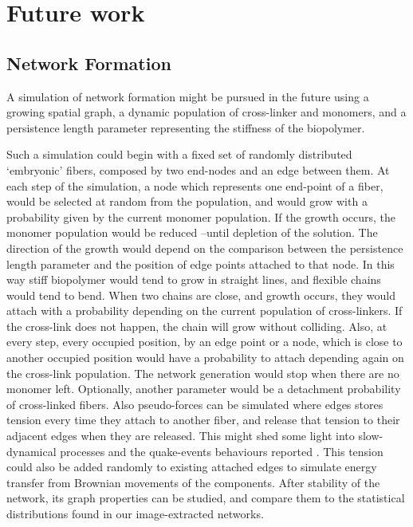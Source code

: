 \section{Future work}%
\label{sec:future_work}

\subsection{Network Formation}%
\label{sub:network_formation}

A simulation of network formation might be pursued in the future
  using a growing spatial graph, a dynamic population of cross-linker and monomers, and a persistence length parameter representing the stiffness of the biopolymer.

  Such a simulation could begin with a fixed set of randomly distributed `embryonic' fibers, composed by two end-nodes and an edge between them. At each step of the simulation, a node which represents one end-point of a fiber, would be selected at random from the population, and would grow with a probability given by the current monomer population. If the growth occurs, the monomer population would be reduced --until depletion of the solution. The direction of the growth would depend on the comparison between the persistence length parameter and the position of edge points attached to that node. In this way stiff biopolymer would tend to grow in straight lines, and flexible chains would tend to bend.
  When two chains are close, and growth occurs, they would attach with a probability depending on the current population of cross-linkers. If the cross-link does not happen, the chain will grow without colliding. Also, at every step, every occupied position, by an edge point or a node, which is close to another occupied position would have a probability to attach depending again on the cross-link population. The network generation would stop when there are no monomer left. Optionally, another parameter would be a detachment probability of cross-linked fibers. Also pseudo-forces can be simulated where edges stores tension every time they attach to another fiber, and release that tension to their adjacent edges when they are released. This might shed some light into slow-dynamical processes and the quake-events behaviours reported \cite{mansel_internal_2015}. This tension could also be added randomly to existing attached edges to simulate energy transfer from Brownian movements of the components. After stability of the network, its graph properties can be studied, and compare them to the statistical distributions found in our image-extracted networks.


